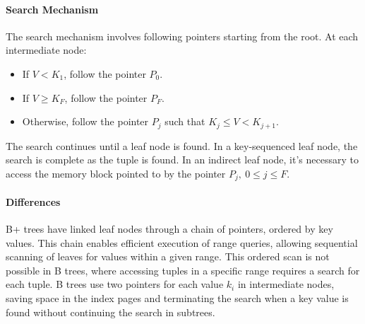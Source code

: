 \paragraph*{Search Mechanism}
The search mechanism involves following pointers starting from the root. 
At each intermediate node:
\begin{itemize}
  \item If $V < K_1$, follow the pointer $P_0$.
  \item If $V \geq K_F$, follow the pointer $P_F$.
  \item Otherwise, follow the pointer $P_j$ such that $K_j \leq V < K_{j + 1}$. 
\end{itemize}
The search continues until a leaf node is found. 
In a key-sequenced leaf node, the search is complete as the tuple is found. 
In an indirect leaf node, it's necessary to access the memory block pointed to by the pointer $P_j, \: 0 \leq j \leq F$.


\paragraph*{Differences}
B+ trees have linked leaf nodes through a chain of pointers, ordered by key values. 
This chain enables efficient execution of range queries, allowing sequential scanning of leaves for values within a given range. 
This ordered scan is not possible in B trees, where accessing tuples in a specific range requires a search for each tuple. 
B trees use two pointers for each value  $k_i$ in intermediate nodes, saving space in the index pages and terminating the search when a key value is found without continuing the search in subtrees.